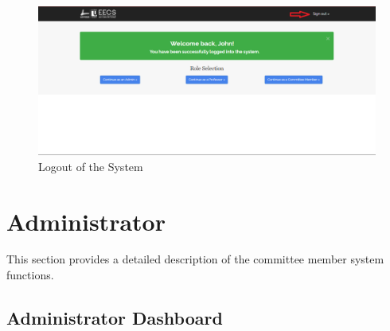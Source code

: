 \documentclass[fontsize=12pt,paper=letter,twoside]{scrartcl}
\begin{document}
\begin{figure}[!htb]
\begin{center}
\includegraphics[width=.99\textwidth]{images/logout.png}
\end{center}
\caption{Logout of the System}
\label{fig:logout}
\end{figure}

\clearpage
\newpage
\section{Administrator}
This section provides a detailed description of the committee member system functions.

\subsection{Administrator Dashboard}
\end{document}
